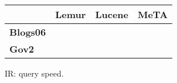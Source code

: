 \begin{figure}[t]
\centering
{\small
\begin{tabular}{|l|r|r|r|}
    \hline & \textbf{Lemur} & \textbf{Lucene} & \textbf{MeTA} \\
    \hline
    \textbf{Blogs06} & & & \\
    \textbf{Gov2} & & & \\
    \hline
\end{tabular}
}
\caption{IR: query speed.}
\label{fig:ir-query-speed}
\end{figure}
